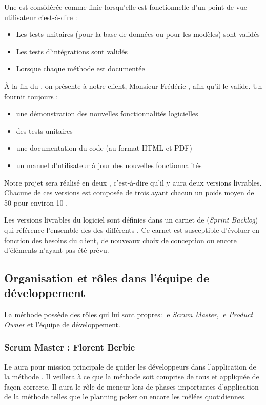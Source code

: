 Une   est considérée comme finie lorsqu'elle est fonctionnelle d’un point de vue utilisateur c'est-à-dire :
\begin{itemize}
	\item Les tests unitaires (pour la base de données ou pour les modèles) sont validés
	\item Les tests d’intégrations sont validés
	\item Lorsque chaque méthode est documentée
\end{itemize}

À la fin du , on présente à notre client, Monsieur Frédéric , afin qu'il le valide. Un  fournit toujours :
\begin{itemize}
	\item une démonstration des nouvelles fonctionnalités logicielles
	\item des tests unitaires
	\item une documentation du code (au format HTML et PDF)
	\item un manuel d’utilisateur à jour des nouvelles fonctionnalités
\end{itemize}

Notre projet sera réalisé en deux , c'est-à-dire qu'il y aura deux versions livrables. Chacune de ces versions est composée de trois 
  ayant chacun un poids moyen de 50 pour environ 10 .

Les versions livrables du logiciel sont définies dans un carnet de  (\textit{Sprint Backlog}) qui référence l'ensemble des  des
différents . Ce carnet est susceptible d’évoluer en fonction des besoins du client, de nouveaux choix de conception ou encore d’éléments
n’ayant pas été prévu. 

\subsection{Organisation et rôles dans l'équipe de développement}
La méthode  possède des rôles qui lui sont propres: le \textit{Scrum Master}, le \textit{Product Owner} et l'équipe de développement. 

\subsubsection{Scrum Master : Florent Berbie}
Le  aura pour mission principale de guider les développeurs dans l'application de la méthode . Il veillera à ce que la méthode soit
comprise de tous et appliquée de façon correcte. Il aura le rôle de meneur lors de phases importantes d’application de la méthode telles que le
planning poker ou encore les mêlées quotidiennes.
